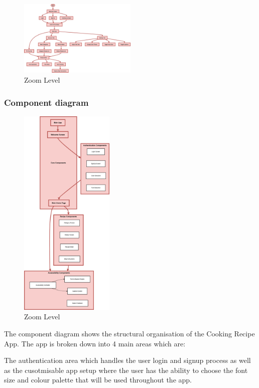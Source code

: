\documentclass[]{project_final}
\begin{document}
\begin{figure}[ht!]
  \centering
  \includegraphics[width=0.5\textwidth]{MRAuserflow.png}
  \vspace*{0.0cm}
  \caption{Zoom Level}
  \label{fig:1}
\end{figure}
\newpage

\subsubsection{Component diagram}
\begin{figure}[ht!]
  \centering
  \includegraphics[width=0.4\textwidth]{componentDiagram.png}
  \vspace*{0.0cm}
  \caption{Zoom Level}
  \label{fig:1}
\end{figure}

The component diagram shows the structural organisation of the Cooking Recipe App. The app is broken down into 4 main areas which are:

The authentication area which handles the user login and signup process as well as the cusotmisable app setup where the user has the ability to choose the font size and colour palette that will be used throughout the app.
\end{document}
